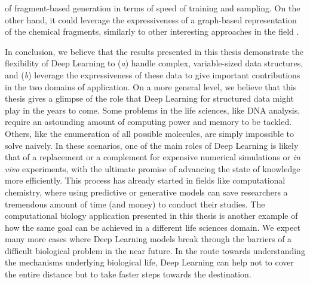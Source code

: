 of fragment-based generation in terms of speed of training and sampling. On the other hand, it could leverage the expressiveness of a graph-based representation of the chemical fragments, similarly to other interesting approaches in the field \citep{jin2019multimodalmoltranslation,bradshaw2020barking}.
\vspace{1em}

In conclusion, we believe that the results presented in this thesis demonstrate the flexibility of Deep Learning to (\emph{a}) handle complex, variable-sized data structures, and (\emph{b}) leverage the expressiveness of these data to give important contributions in the two domains of application. On a more general level, we believe that this thesis gives a glimpse of the role that Deep Learning for structured data might play in the years to come. Some problems in the life sciences, like DNA analysis, require an astounding amount of computing power and memory to be tackled. Others, like the enumeration of all possible molecules, are simply impossible to solve naively. In these scenarios, one of the main roles of Deep Learning is likely that of a replacement or a complement for expensive numerical simulations or \emph{in vivo} experiments, with the ultimate promise of advancing the state of knowledge more efficiently. This process has already started in fields like computational chemistry, where using predictive or generative models can save researchers a tremendous amount of time (and money) to conduct their studies. The computational biology application presented in this thesis is another example of how the same goal can be achieved in a different life sciences domain. We expect many more cases where Deep Learning models break through the barriers of a difficult biological problem in the near future. In the route towards understanding the mechanisms underlying biological life, Deep Learning can help not to cover the entire distance but to take faster steps towards the destination.